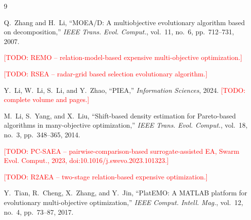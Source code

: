 \documentclass[final,5p,times,twocolumn]{elsarticle}
\newcommand{\TODO}[1]{\textcolor{red}{[TODO: #1]}}
\begin{document}
\begin{thebibliography}{9}

Q.~Zhang and H.~Li,
``MOEA/D: A multiobjective evolutionary algorithm based on decomposition,''
\emph{IEEE Trans. Evol. Comput.}, vol.~11, no.~6, pp.~712--731, 2007.

\TODO{REMO -- relation-model-based expensive multi-objective optimization.}

\TODO{RSEA -- radar-grid based selection evolutionary algorithm.}

Y.~Li, W.~Li, S.~Li, and Y.~Zhao,
``PIEA,'' \emph{Information Sciences}, 2024.
\TODO{complete volume and pages.}

M.~Li, S.~Yang, and X.~Liu,
``Shift-based density estimation for Pareto-based algorithms in
many-objective optimization,''
\emph{IEEE Trans. Evol. Comput.}, vol.~18, no.~3, pp.~348--365, 2014.

\TODO{PC-SAEA -- pairwise-comparison-based surrogate-assisted EA,
Swarm Evol. Comput., 2023, doi:10.1016/j.swevo.2023.101323.}

\TODO{R2AEA -- two-stage relation-based expensive optimization.}

Y.~Tian, R.~Cheng, X.~Zhang, and Y.~Jin,
``PlatEMO: A MATLAB platform for evolutionary multi-objective optimization,''
\emph{IEEE Comput. Intell. Mag.}, vol.~12, no.~4, pp.~73--87, 2017.

\end{thebibliography}
\end{document}
